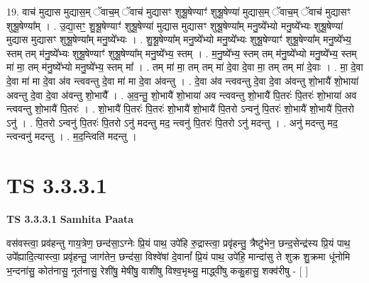 \documentclass[17pt]{extarticle}
\begin{document}
19. वाच॑ मुद्यास मुद्यास॒म् ॅवाच॒म् ॅवाच॑ मुद्यासꣳ शुश्रू॒षेण्याꣳ॑ शुश्रू॒षेण्या॑ मुद्यास॒म् ॅवाच॒म् ॅवाच॑ मुद्यासꣳ शुश्रू॒षेण्या᳚म् । . उ॒द्या॒सꣳ॒॒ शु॒श्रू॒षेण्याꣳ॑ शुश्रू॒षेण्या॑ मुद्यास मुद्यासꣳ शुश्रू॒षेण्या᳚म् मनु॒ष्ये᳚भ्यो मनु॒ष्ये᳚भ्यः शुश्रू॒षेण्या॑ मुद्यास मुद्यासꣳ शुश्रू॒षेण्या᳚म् मनु॒ष्ये᳚भ्यः । . शु॒श्रू॒षेण्या᳚म् मनु॒ष्ये᳚भ्यो मनु॒ष्ये᳚भ्यः शुश्रू॒षेण्याꣳ॑ शुश्रू॒षेण्या᳚म् मनु॒ष्ये᳚भ्य॒ स्तम् तम् म॑नु॒ष्ये᳚भ्यः शुश्रू॒षेण्याꣳ॑ शुश्रू॒षेण्या᳚म् मनु॒ष्ये᳚भ्य॒ स्तम् । . म॒नु॒ष्ये᳚भ्य॒ स्तम् तम् म॑नु॒ष्ये᳚भ्यो मनु॒ष्ये᳚भ्य॒ स्तम् मा॑ मा॒ तम् म॑नु॒ष्ये᳚भ्यो मनु॒ष्ये᳚भ्य॒ स्तम् मा᳚ । . तम् मा॑ मा॒ तम् तम् मा॑ दे॒वा दे॒वा मा॒ तम् तम् मा॑ दे॒वाः । . मा॒ दे॒वा दे॒वा मा॑ मा दे॒वा अ॑व न्त्ववन्तु दे॒वा मा॑ मा दे॒वा अ॑वन्तु । . दे॒वा अ॑व न्त्ववन्तु दे॒वा दे॒वा अ॑वन्तु शो॒भायै॑ शो॒भाया॑ अवन्तु दे॒वा दे॒वा अ॑वन्तु शो॒भायै᳚ । . अ॒व॒न्तु॒ शो॒भायै॑ शो॒भाया॑ अव न्त्ववन्तु शो॒भायै॑ पि॒तरः॑ पि॒तरः॑ शो॒भाया॑ अव न्त्ववन्तु शो॒भायै॑ पि॒तरः॑ । . शो॒भायै॑ पि॒तरः॑ पि॒तरः॑ शो॒भायै॑ शो॒भायै॑ पि॒तरो ऽन्वनु॑ पि॒तरः॑ शो॒भायै॑ शो॒भायै॑ पि॒तरो ऽनु॑ । . पि॒तरो ऽन्वनु॑ पि॒तरः॑ पि॒तरो ऽनु॑ मदन्तु मद॒ न्त्वनु॑ पि॒तरः॑ पि॒तरो ऽनु॑ मदन्तु । . अनु॑ मदन्तु मद॒ न्त्वन्वनु॑ मदन्तु । . म॒द॒न्त्विति॑ मदन्तु । \newline
\pagebreak
{}

\section{ TS 3.3.3.1 }

\textbf{TS 3.3.3.1 } \newline
\textbf{Samhita Paata} \newline

वस॑वस्त्वा॒ प्रव॑हन्तु गाय॒त्रेण॒ छन्द॑सा॒ऽग्नेः प्रि॒यं पाथ॒ उपे॑हि रु॒द्रास्त्वा॒ प्रवृ॑हन्तु॒ त्रैष्टु॑भेन॒ छन्द॒सेन्द्र॑स्य प्रि॒यं पाथ॒ उपे᳚ह्यादि॒त्यास्त्वा॒ प्रवृ॑हन्तु॒ जाग॑तेन॒ छन्द॑सा॒ विश्वे॑षां दे॒वानां᳚ प्रि॒यं पाथ॒ उपे॑हि॒ मान्दा॑सु ते शुक्र शु॒क्रमा धू॑नोमि भ॒न्दना॑सु॒ कोत॑नासु॒ नूत॑नासु॒ रेशी॑षु॒ मेषी॑षु॒ वाशी॑षु विश्व॒भृथ्सु॒ माद्ध्वी॑षु ककु॒हासु॒ शक्व॑रीषु - [  ] \newline
\end{document}
